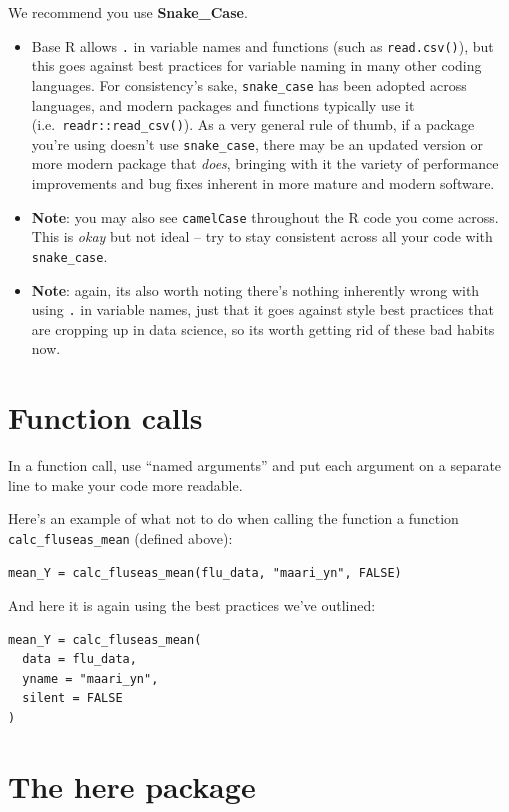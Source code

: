 \documentclass[
]{book}
\begin{document}
We recommend you use \textbf{Snake\_Case}.

\begin{itemize}
\item
  Base R allows \texttt{.} in variable names and functions (such as \texttt{read.csv()}), but this goes against best practices for variable naming in many other coding languages. For consistency's sake, \texttt{snake\_case} has been adopted across languages, and modern packages and functions typically use it (i.e.~\texttt{readr::read\_csv()}). As a very general rule of thumb, if a package you're using doesn't use \texttt{snake\_case}, there may be an updated version or more modern package that \emph{does}, bringing with it the variety of performance improvements and bug fixes inherent in more mature and modern software.
\item
  \textbf{Note}: you may also see \texttt{camelCase} throughout the R code you come across. This is \emph{okay} but not ideal -- try to stay consistent across all your code with \texttt{snake\_case}.
\item
  \textbf{Note}: again, its also worth noting there's nothing inherently wrong with using \texttt{.} in variable names, just that it goes against style best practices that are cropping up in data science, so its worth getting rid of these bad habits now.
\end{itemize}

\section{Function calls}\label{function-calls}

In a function call, use ``named arguments'' and put each argument on a separate line to make your code more readable.

Here's an example of what not to do when calling the function a function \texttt{calc\_fluseas\_mean} (defined above):

\begin{verbatim}
mean_Y = calc_fluseas_mean(flu_data, "maari_yn", FALSE)
\end{verbatim}

And here it is again using the best practices we've outlined:

\begin{verbatim}
mean_Y = calc_fluseas_mean(
  data = flu_data, 
  yname = "maari_yn",
  silent = FALSE
)
\end{verbatim}

\section{The here package}\label{the-here-package}
\end{document}
